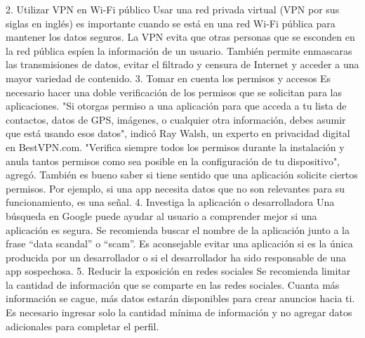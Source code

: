 \documentclass{article}%
\begin{document}
\newline%
%
2. Utilizar VPN en Wi{-}Fi público%
\newline%
%
Usar una red privada virtual (VPN por sus siglas en inglés) es importante cuando se está en una red Wi{-}Fi pública para mantener los datos seguros.%
\newline%
%
La VPN evita que otras personas que se esconden en la red pública espíen la información de un usuario. También permite enmascaras las transmisiones de datos, evitar el filtrado y censura de Internet y acceder a una mayor variedad de contenido.%
\newline%
%
3. Tomar en cuenta los permisos y accesos%
\newline%
%
Es necesario hacer una doble verificación de los permisos que se solicitan para las aplicaciones.%
\newline%
%
"Si otorgas permiso a una aplicación para que acceda a tu lista de contactos, datos de GPS, imágenes, o cualquier otra información, debes asumir que está usando esos datos", indicó Ray Walsh, un experto en privacidad digital en BestVPN.com. "Verifica siempre todos los permisos durante la instalación y anula tantos permisos como sea posible en la configuración de tu dispositivo", agregó.%
\newline%
%
También es bueno saber si tiene sentido que una aplicación solicite ciertos permisos. Por ejemplo, si una app necesita datos que no son relevantes para su funcionamiento, es una señal.%
\newline%
%
4. Investiga la aplicación o desarrolladora%
\newline%
%
Una búsqueda en Google puede ayudar al usuario a comprender mejor si una aplicación es segura. Se recomienda buscar el nombre de la aplicación junto a la frase “data scandal” o “scam”.%
\newline%
%
Es aconsejable evitar una aplicación si es la única producida por un desarrollador o si el desarrollador ha sido responsable de una app sospechosa.%
\newline%
%
5. Reducir la exposición en redes sociales%
\newline%
%
Se recomienda limitar la cantidad de información que se comparte en las redes sociales. Cuanta más información se cague, más datos estarán disponibles para crear anuncios hacia ti.%
\newline%
%
Es necesario ingresar solo la cantidad mínima de información y no agregar datos adicionales para completar el perfil.%
\newline%
\end{document}
